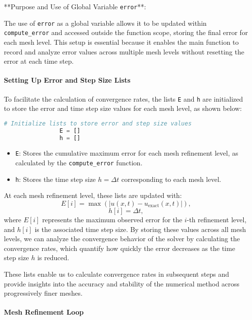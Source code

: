 \documentclass{article}
\begin{document}
			**Purpose and Use of Global Variable \texttt{error}**:
			
			The use of \texttt{error} as a global variable allows it to be updated within \texttt{compute\_error} and accessed outside the function scope, storing the final error for each mesh level. This setup is essential because it enables the main function to record and analyze error values across multiple mesh levels without resetting the error at each time step.
			
			\paragraph{Setting Up Error and Step Size Lists}
			
			To facilitate the calculation of convergence rates, the lists \texttt{E} and \texttt{h} are initialized to store the error and time step size values for each mesh level, as shown below:
			
			\begin{lstlisting}[language=Python]
				# Initialize lists to store error and step size values
				E = []
				h = []
			\end{lstlisting}
			
			\begin{itemize}
				\item \texttt{E}: Stores the cumulative maximum error for each mesh refinement level, as calculated by the \texttt{compute\_error} function.
				\item \texttt{h}: Stores the time step size \( h = \Delta t \) corresponding to each mesh level.
			\end{itemize}
			
			At each mesh refinement level, these lists are updated with:
			\[
			E[i] = \max \left( |u(x, t) - u_{\text{exact}}(x, t)| \right),
			\]
			\[
			h[i] = \Delta t,
			\]
			where \( E[i] \) represents the maximum observed error for the \( i \)-th refinement level, and \( h[i] \) is the associated time step size. By storing these values across all mesh levels, we can analyze the convergence behavior of the solver by calculating the convergence rates, which quantify how quickly the error decreases as the time step size \( h \) is reduced.
			
			These lists enable us to calculate convergence rates in subsequent steps and provide insights into the accuracy and stability of the numerical method across progressively finer meshes.
			
			
			\paragraph{Mesh Refinement Loop}
			
\end{document}
